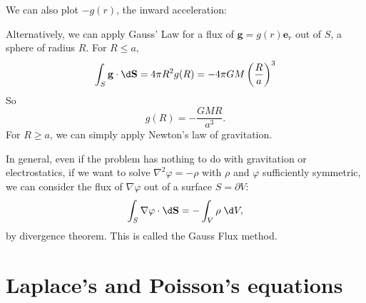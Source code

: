 \documentclass[a4paper]{article}
\begin{document}
\begin{eg}
\begin{center}
  \end{center}
  We can also plot $-g(r)$, the inward acceleration:
  \begin{center}
  \end{center}
  Alternatively, we can apply Gauss' Law for a flux of $\mathbf{g} = g(r) \mathbf{e}_r$ out of $S$, a sphere of radius $R$. For $R \leq a$,
  \[
    \int_S \mathbf{g}\cdot \d \mathbf{S} = 4\pi R^2 g(R) = -4\pi GM\left(\frac{R}{a}\right)^3
  \]
  So
  \[
    g(R) = -\frac{GMR}{a^3}.
  \]
  For $R \geq a$, we can simply apply Newton's law of gravitation.

  In general, even if the problem has nothing to do with gravitation or electrostatics, if we want to solve $\nabla^2 \varphi = -\rho$ with $\rho$ and $\varphi$ sufficiently symmetric, we can consider the flux of $\nabla \varphi$ out of a surface $S = \partial V$:
  \[
    \int_S \nabla \varphi \cdot \d \mathbf{S} = -\int_V \rho \;\d V,
  \]
  by divergence theorem. This is called the Gauss Flux method.
\end{eg}

\section{Laplace's and Poisson's equations}
\end{document}
